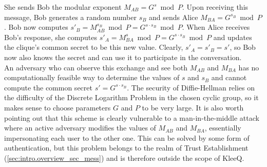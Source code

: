 \documentclass[a4paper, 12pt]{report}
\begin{document}
She sends Bob the modular exponent $M_{AB} = G^{s} \bmod P$. Upon receiving this message, Bob generates a random number $s_B$ and sends Alice $M_{BA} = G^{s_B} \bmod P$. Bob now computes $s'_B = M_{AB}^{s_B} \bmod P = G^{s \cdot s_B} \bmod P$. When Alice receives Bob's response, she computes $s'_A = M_{BA}^{s} \bmod P = G^{s \cdot s_B} \bmod P$ and updates the clique's common secret to be this new value. Clearly, $s'_A = s'_B = s'$, so Bob now also knows the secret and can use it to participate in the conversation. \\

An adversary who can observe this exchange and see both $M_{AB}$ and $M_{BA}$ has no computationally feasible way to determine the values of $s$ and $s_B$ and cannot compute the common secret $s' = G^{s \cdot s_B}$. The security of Diffie-Hellman relies on the difficulty of the Discrete Logarithm Problem in the chosen cyclic group, so it makes sense to choose parameters $G$ and $P$ to be very large. It is also worth pointing out  that this scheme is clearly vulnerable to a man-in-the-middle attack where an active adversary modifies the values of $M_{AB}$ and $M_{BA}$, essentially impersonating each user to the other one. This can be solved by some form of authentication, but this problem belongs to the realm of Trust Establishment (\cref{sec:intro.overview_sec_mess}) and is therefore outside the scope of KleeQ.
\end{document}
